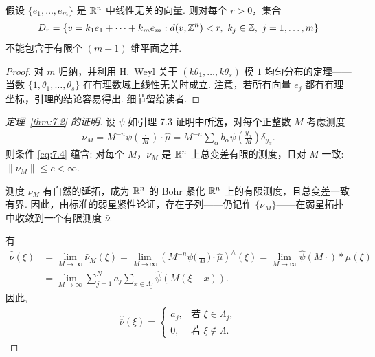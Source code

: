 \begin{lemma}\label{lem:7.5}
假设 $\{e_1, \ldots, e_m\}$ 是 $\mathbb{R}^n$ 中线性无关的向量. 则对每个 $r > 0$，集合
\begin{align*}
  D_{r}=\{v=k_{1}e_{1}+\cdots+k_{m}e_{m}:d(v,\Z^{n})<r,\ k_{j}\in\Z,\ j=1,\ldots,m\}
\end{align*}
不能包含于有限个 $(m-1)$ 维平面之并.
\end{lemma}

\begin{proof}
对 $m$ 归纳，并利用 H.~Weyl 关于 $(k\theta_1,\ldots,k\theta_s)$ 模 $1$ 均匀分布的定理——当数 $\{1,\theta_1,\ldots,\theta_s\}$ 在有理数域上线性无关时成立. 注意，若所有向量 $e_j$ 都有有理坐标，引理的结论容易得出. 细节留给读者.
\end{proof}

\begin{proof}[定理~\ref{thm:7.2} 的证明]
设 $\psi$ 如引理 7.3 证明中所选，对每个正整数 $M$ 考虑测度
\begin{align*}
  \nu_{M}=M^{-n}\psi\left(\frac{\cdot}{M}\right)\cdot\widehat{\mu}
  =M^{-n}\sum_{\alpha}b_{\alpha}\psi\left(\frac{y_{\alpha}}{M}\right)\delta_{y_{\alpha}}.
\end{align*}
则条件 \eqref{eq:7.4} 蕴含: 对每个 $M$，$\nu_M$ 是 $\mathbb{R}^n$ 上总变差有限的测度，且对 $M$ 一致: $\|\nu_M\| \leq c < \infty$.

测度 $\nu_M$ 有自然的延拓，成为 $\mathbb{R}^n$ 的 Bohr 紧化 $\mathbb{R}^n$ 上的有限测度，且总变差一致有界. 因此，由标准的弱星紧性论证，存在子列——仍记作 $\{\nu_M\}$——在弱星拓扑中收敛到一个有限测度 $\bar{\nu}$.

有
\begin{align*}
  \widehat{\overline{\nu}}(\xi)
  &=\lim_{M\to\infty}\widehat{\nu}_{M}(\xi)
  =\lim_{M\to\infty}\left(M^{-n}\psi\Big(\frac{\cdot}{M}\Big)\cdot\widehat{\mu}\right)^{\wedge}(\xi)
  =\lim_{M\to\infty}\widehat{\psi}(M\cdot)*\mu(\xi)\\
  &=\lim_{M\to\infty}\sum_{j=1}^{N}a_{j}\sum_{x\in\Lambda_{j}}\widehat{\psi}(M(\xi-x)).
\end{align*}
因此,
\begin{align*}
  \widehat{\overline{\nu}}(\xi)=\begin{cases}
    a_{j}, & \text{若 } \xi\in\Lambda_{j},\\
    0, & \text{若 } \xi\notin\Lambda.
  \end{cases}
\end{align*}


\end{proof}
